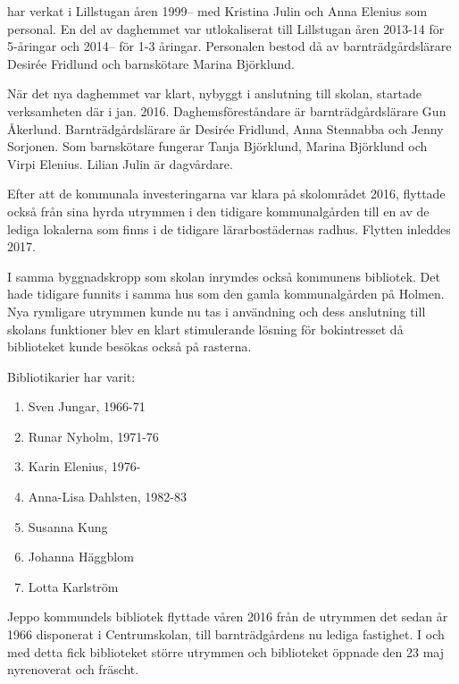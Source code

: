  har verkat i Lillstugan åren 1999-- med Kristina Julin och Anna Elenius som personal. En del av daghemmet var utlokaliserat till Lillstugan åren 2013-14 för 5-åringar och 2014-- för 1-3 åringar. Personalen bestod då av barnträdgårdslärare Desirée Fridlund och barnskötare Marina Björklund.

När det nya daghemmet var klart, nybyggt i anslutning till skolan, startade verksamheten där i jan. 2016. Daghemsföreståndare är barnträdgårdslärare Gun Åkerlund. Barnträdgårdslärare är Desirée Fridlund, Anna Stennabba och Jenny Sorjonen. Som barnskötare fungerar Tanja Björklund, Marina Björklund och Virpi Elenius. Lilian Julin är dagvårdare.

Efter att de kommunala investeringarna var klara på skolområdet 2016, flyttade också  från sina hyrda utrymmen i den tidigare kommunalgården till en av de lediga lokalerna som finns i de tidigare lärarbostädernas radhus. Flytten inleddes 2017.


I samma byggnadskropp som skolan inrymdes också kommunens bibliotek. Det hade tidigare funnits i samma hus som den gamla kommunalgården på Holmen. Nya rymligare utrymmen kunde nu tas i användning och dess anslutning till skolans funktioner blev en klart stimulerande lösning för bokintresset då biblioteket kunde besökas också på rasterna.

Bibliotikarier har varit:
\begin{enumerate}
  \item Sven Jungar, 1966-71
  \item Runar Nyholm, 1971-76
  \item Karin Elenius, 1976-
  \item Anna-Lisa Dahlsten, 1982-83
  \item Susanna Kung
  \item Johanna Häggblom
  \item Lotta Karlström
\end{enumerate}





Jeppo kommundels bibliotek flyttade våren 2016 från de utrymmen det sedan år 1966 disponerat i Centrumskolan, till barnträdgårdens nu lediga fastighet. I och med detta fick biblioteket större utrymmen och biblioteket öppnade den 23 maj nyrenoverat och fräscht.


